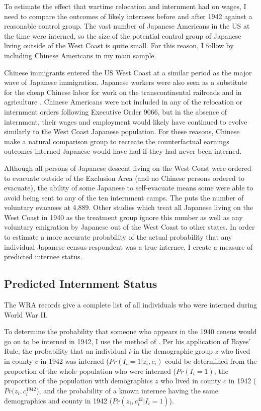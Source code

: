 To estimate the effect that wartime relocation and internment had on wages, I need to compare the outcomes of likely internees before and after 1942 against a reasonable control group.
The vast number of Japanese Americans in the US at the time were interned, so the size of the potential control group of Japanese living outside of the West Coast is quite small.
For this reason, I follow \citeauthor{arellano-boverDisplacementDiversityMobility2022} by including Chinese Americans in my main sample.

Chinese immigrants entered the US West Coast at a similar period as the major wave of Japanese immigration.
Japanese workers were also seen as a substitute for the cheap Chinese labor for work on the transcontinental railroads and in agriculture 
\citep{chenImpactSkillBasedImmigration2015}.
Chinese Americans were not included in any of the relocation or internment orders following Executive Order 9066,
but in the absence of internment, their wages and employment would likely have continued to evolve similarly to the West Coast Japanese population.
For these reasons, Chinese make a natural comparison group to recreate the counterfactual earnings outcomes interned Japanese would have had if they had never been interned.

Although all persons of Japanese descent living on the West Coast were ordered to evacuate outside of the Exclusion Area
(and no Chinese persons ordered to evacuate),
the ability of some Japanese to self-evacuate means some were able to avoid being sent to any of the ten internment camps.
The \cite{dewittjohnl.FinalReportJapanese1943} puts the number of voluntary evacuees at 4,889.
Other studies which treat all Japanese living on the West Coast in 1940 as the treatment group
ignore this number as well as any voluntary emigration by Japanese out of the West Coast to other states.
In order to estimate a more accurate probability of the actual probability that any individual Japanese census respondent was a true internee,
I create a measure of predicted internee status.

\subsection{Predicted Internment Status}\label{sec:data-intern}

The WRA records give a complete list of all individuals who were interned during World War II.

To determine the probability that someone who appears in the 1940 census would go on to be interned in 1942, I use the method of \cite{arellano-boverDisplacementDiversityMobility2022}.
Per his application of Bayes' Rule, the probability that an individual $i$ in the demographic group $z$ who lived in county $c$ in 1942 was interned ($Pr(I_{i}=1|z_i,c_{i})$
could be determined from the proportion of the whole population who were interned ($Pr(I_{i}=1)$,
the proportion of the population with demographics $z$ who lived in county $c$ in 1942 ($Pr(z_i,c_{i}^{1942}$),
and the probability of a known internee having the same demographics and county in 1942 ($Pr(z_i,c_i^{42}|I_i=1)$).

